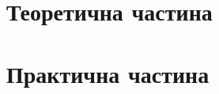 \documentclass[a4paper,14pt]{extreport}
\begin{document}


\setcounter{page}{2} %

\chapter{Теоретична частина}






\chapter{Практична частина}
			
			
				
			
\end{document}
